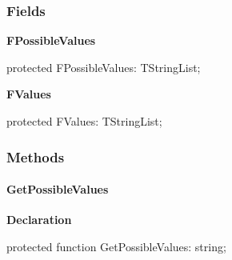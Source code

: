 \documentclass{report}
\newif\ifpdf
\begin{document}
\subsubsection*{\large{\textbf{Fields}}\normalsize\hspace{1ex}\hfill}
\begin{list}{}{
\setlength{\itemindent}{0cm}
\setlength{\listparindent}{0cm}
\setlength{\leftmargin}{\evensidemargin}
\addtolength{\leftmargin}{\tmplength}
\settowidth{\labelsep}{X}
\addtolength{\leftmargin}{\labelsep}
\setlength{\labelwidth}{\tmplength}
}
\label{PasDoc_OptionParser.TSetOption-FPossibleValues}
\item[\textbf{FPossibleValues}\hfill]
\ifpdf
\begin{flushleft}
\fi
\begin{ttfamily}
protected FPossibleValues: TStringList;\end{ttfamily}

\ifpdf
\end{flushleft}
\fi


\par  \label{PasDoc_OptionParser.TSetOption-FValues}
\item[\textbf{FValues}\hfill]
\ifpdf
\begin{flushleft}
\fi
\begin{ttfamily}
protected FValues: TStringList;\end{ttfamily}

\ifpdf
\end{flushleft}
\fi


\par  \end{list}
\subsubsection*{\large{\textbf{Methods}}\normalsize\hspace{1ex}\hfill}
\paragraph*{GetPossibleValues}\hspace*{\fill}

\label{PasDoc_OptionParser.TSetOption-GetPossibleValues}
\begin{list}{}{
\setlength{\itemindent}{0cm}
\setlength{\listparindent}{0cm}
\setlength{\leftmargin}{\evensidemargin}
\addtolength{\leftmargin}{\tmplength}
\settowidth{\labelsep}{X}
\addtolength{\leftmargin}{\labelsep}
\setlength{\labelwidth}{\tmplength}
}
\item[\textbf{Declaration}\hfill]
\ifpdf
\begin{flushleft}
\fi
\begin{ttfamily}
protected function GetPossibleValues: string;\end{ttfamily}

\ifpdf
\end{flushleft}
\fi

\end{list}
\end{document}
